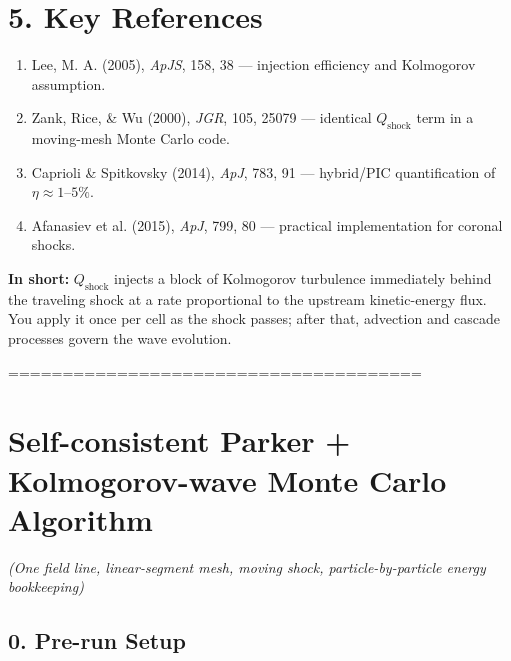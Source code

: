 \section*{5. Key References}

\begin{enumerate}
    \item Lee, M. A. (2005), \textit{ApJS}, 158, 38 — injection efficiency and Kolmogorov assumption.
    \item Zank, Rice, \& Wu (2000), \textit{JGR}, 105, 25079 — identical $Q_{\text{shock}}$ term in a moving-mesh Monte Carlo code.
    \item Caprioli \& Spitkovsky (2014), \textit{ApJ}, 783, 91 — hybrid/PIC quantification of $\eta \approx 1$--$5\%$.
    \item Afanasiev et al. (2015), \textit{ApJ}, 799, 80 — practical implementation for coronal shocks.
\end{enumerate}

\bigskip

\noindent\textbf{In short:} $Q_{\text{shock}}$ injects a block of Kolmogorov turbulence immediately behind the traveling shock at a rate proportional to the upstream kinetic-energy flux. You apply it once per cell as the shock passes; after that, advection and cascade processes govern the wave evolution.



======================================


\section*{Self-consistent Parker + Kolmogorov-wave Monte Carlo Algorithm}

\noindent
\emph{(One field line, linear-segment mesh, moving shock, particle-by-particle energy bookkeeping)}

\subsection*{0. Pre-run Setup}

